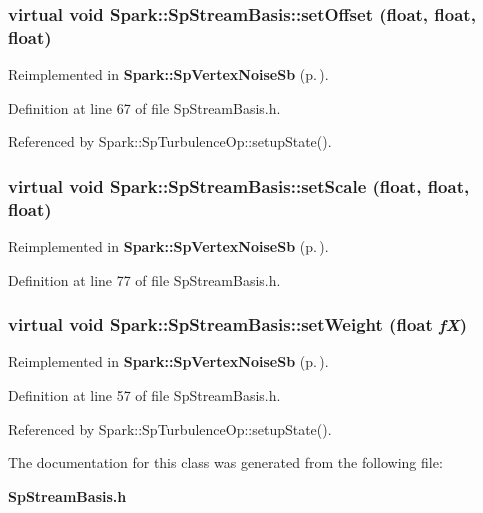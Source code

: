 \subsubsection{\setlength{\rightskip}{0pt plus 5cm}virtual void Spark::Sp\-Stream\-Basis::set\-Offset (float, float, float)\hspace{0.3cm}{\tt  [inline, virtual]}}\label{classSpark_1_1SpStreamBasis_a6}




Reimplemented in {\bf Spark::Sp\-Vertex\-Noise\-Sb} {\rm (p.\,\pageref{classSpark_1_1SpVertexNoiseSb_a9})}.

Definition at line 67 of file Sp\-Stream\-Basis.h.

Referenced by Spark::Sp\-Turbulence\-Op::setup\-State().
\subsubsection{\setlength{\rightskip}{0pt plus 5cm}virtual void Spark::Sp\-Stream\-Basis::set\-Scale (float, float, float)\hspace{0.3cm}{\tt  [inline, virtual]}}\label{classSpark_1_1SpStreamBasis_a8}




Reimplemented in {\bf Spark::Sp\-Vertex\-Noise\-Sb} {\rm (p.\,\pageref{classSpark_1_1SpVertexNoiseSb_a7})}.

Definition at line 77 of file Sp\-Stream\-Basis.h.
\subsubsection{\setlength{\rightskip}{0pt plus 5cm}virtual void Spark::Sp\-Stream\-Basis::set\-Weight (float {\em f\-X})\hspace{0.3cm}{\tt  [inline, virtual]}}\label{classSpark_1_1SpStreamBasis_a4}




Reimplemented in {\bf Spark::Sp\-Vertex\-Noise\-Sb} {\rm (p.\,\pageref{classSpark_1_1SpVertexNoiseSb_a11})}.

Definition at line 57 of file Sp\-Stream\-Basis.h.

Referenced by Spark::Sp\-Turbulence\-Op::setup\-State().

The documentation for this class was generated from the following file:\begin{CompactItemize}
\item 
{\bf Sp\-Stream\-Basis.h}\end{CompactItemize}
